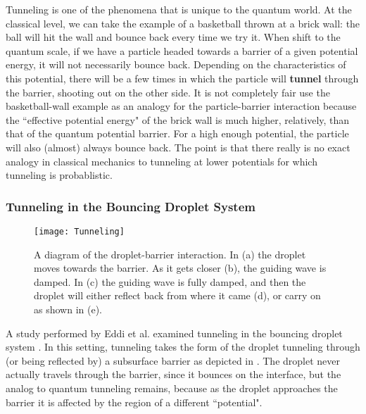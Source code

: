 Tunneling is one of the phenomena that is unique to the quantum world. At the classical level, we can take the example of a basketball thrown at a brick wall: the ball will hit the wall and bounce back every time we try it. When shift to the quantum scale, if we have a particle headed towards a barrier of a given potential energy, it will not necessarily bounce back. Depending on the characteristics of this potential, there will be a few times in which the particle will \textbf{tunnel} through the barrier, shooting out on the other side. It is not completely fair use the basketball-wall example as an analogy for the particle-barrier interaction because the ``effective potential energy" of the brick wall is much higher, relatively, than that of the quantum potential barrier. For a high enough potential, the particle will also (almost) always bounce back. The point is that there really is no exact analogy in classical mechanics to tunneling at lower potentials for which tunneling is probablistic. 

    \subsubsection{Tunneling in the Bouncing Droplet System}

\begin{figure}[h!]
 \centering
	    \texttt{[image: Tunneling]}
	     \caption{A diagram of the droplet-barrier interaction. In (a) the droplet moves towards the barrier. As it gets closer (b), the guiding wave is damped. In (c) the guiding wave is fully damped, and then the droplet will either reflect back from where it came (d), or carry on as shown in (e).}
	 \label{tuncartoon}
	\end{figure}
	A study performed by Eddi et al. examined tunneling in the bouncing droplet system \cite{tunneling}. In this setting, tunneling takes the form of the droplet tunneling through (or being reflected by) a subsurface barrier as depicted in . The droplet never actually travels through the barrier, since it bounces on the interface, but the analog to quantum tunneling remains, because as the droplet approaches the barrier it is affected by the region of a different ``potential". 
	
